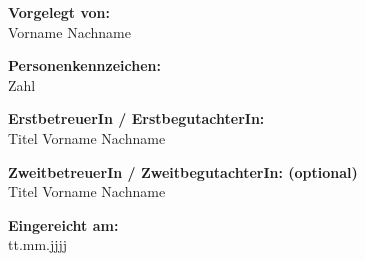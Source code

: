 \begin{titlepage}
  \vspace{1.6cm}

  \hspace*{-1.0cm} \textbf{Vorgelegt von:} \\
  \vspace{0.2cm}
  \hspace*{-1.0cm} Vorname Nachname \\

  \vspace{0.7cm}

  \hspace*{-1.0cm} \textbf{Personenkennzeichen:}\\
  \vspace{0.2cm}
  \hspace*{-1.0cm} Zahl \\

  \vspace{0.7cm}

  \hspace*{-1.0cm} \textbf{ErstbetreuerIn / ErstbegutachterIn:} \\
  \vspace{0.2cm}
  \hspace*{-1.0cm} Titel Vorname Nachname \\

  \vspace{0.7cm}

  \hspace*{-1.0cm} \textbf{ZweitbetreuerIn / ZweitbegutachterIn: (optional)} \\
  \vspace{0.2cm}
  \hspace*{-1.0cm} Titel Vorname Nachname \\


  \vspace{0.7cm}

  \hspace*{-1.0cm} \textbf{Eingereicht am:} \\
  \vspace{0.2cm}
  \hspace*{-1.0cm} tt.mm.jjjj \\
\end{titlepage}
